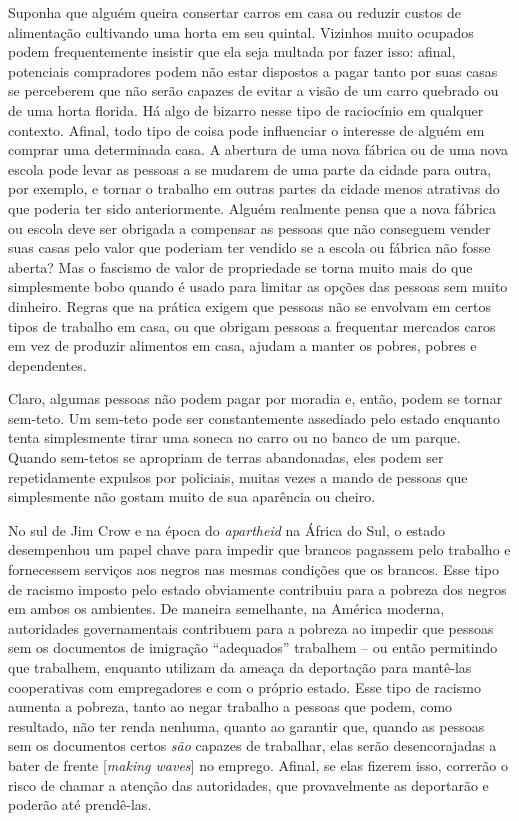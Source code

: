 Suponha que alguém queira consertar carros em casa ou reduzir custos de alimentação cultivando uma horta em seu quintal. Vizinhos muito ocupados podem frequentemente insistir que ela seja multada por fazer isso: afinal, potenciais compradores podem não estar dispostos a pagar tanto por suas casas se perceberem que não serão capazes de evitar a visão de um carro quebrado ou de uma horta florida. Há algo de bizarro nesse tipo de raciocínio em qualquer contexto. Afinal, todo tipo de coisa pode influenciar o interesse de alguém em comprar uma determinada casa. A abertura de uma nova fábrica ou de uma nova escola pode levar as pessoas a se mudarem de uma parte da cidade para outra, por exemplo, e tornar o trabalho em outras partes da cidade menos atrativas do que poderia ter sido anteriormente. Alguém realmente pensa que a nova fábrica ou escola deve ser obrigada a compensar as pessoas que não conseguem vender suas casas pelo valor que poderiam ter vendido se a escola ou fábrica não fosse aberta? Mas o fascismo de valor de propriedade se torna muito mais do que simplesmente bobo quando é usado para limitar as opções das pessoas sem muito dinheiro. Regras que na prática exigem que pessoas não se envolvam em certos tipos de trabalho em casa, ou que obrigam pessoas a frequentar mercados caros em vez de produzir alimentos em casa, ajudam a manter os pobres, pobres e dependentes.

Claro, algumas pessoas não podem pagar por moradia e, então, podem se tornar sem-teto. Um sem-teto pode ser constantemente assediado pelo estado enquanto tenta simplesmente tirar uma soneca no carro ou no banco de um parque. Quando sem-tetos se apropriam de terras abandonadas, eles podem ser repetidamente expulsos por policiais, muitas vezes a mando de pessoas que simplesmente não gostam muito de sua aparência ou cheiro.

No sul de Jim Crow e na época do \emph{apartheid} na África do Sul, o estado desempenhou um papel chave para impedir que brancos pagassem pelo trabalho e fornecessem serviços aos negros nas mesmas condições que os brancos. Esse tipo de racismo imposto pelo estado obviamente contribuiu para a pobreza dos negros em ambos os ambientes. De maneira semelhante, na América moderna, autoridades governamentais contribuem para a pobreza ao impedir que pessoas sem os documentos de imigração ``adequados'' trabalhem -- ou então permitindo que trabalhem, enquanto utilizam da ameaça da deportação para mantê-las cooperativas com empregadores e com o próprio estado. Esse tipo de racismo aumenta a pobreza, tanto ao negar trabalho a pessoas que podem, como resultado, não ter renda nenhuma, quanto ao garantir que, quando as pessoas sem os documentos certos \emph{são} capazes de trabalhar, elas serão desencorajadas a bater de frente [\emph{making waves}] no emprego. Afinal, se elas fizerem isso, correrão o risco de chamar a atenção das autoridades, que provavelmente as deportarão e poderão até prendê-las. 


